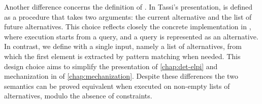 Another difference concerns the definition of \runE. In Tassi's presentation,
\runE is defined as a procedure that takes two arguments:
the current alternative and the list of future alternatives. This choice
reflects closely the concrete implementation in \elpi, where execution starts
from a query, and a query is represented as an alternative. In contrast, we
define \runE with a single input, namely a list of alternatives, from which the
first element is extracted by pattern matching when needed. This design choice
aims to simplify the presentation of \cref{chap:det-elpi}
and mechanization in \rocq of \cref{chap:mechanization}.
Despite these differences the two semantics can be proved
equivalent when executed on non-empty lists of alternatives, modulo the
absence of constraints.


